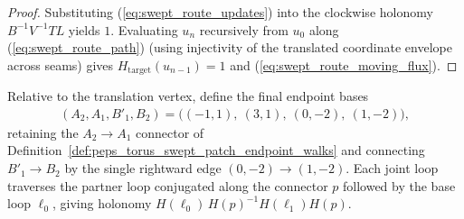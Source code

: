 \begin{proof}\leanok
    Substituting (\ref{eq:swept_route_updates}) into the clockwise holonomy $B^{-1}V^{-1}TL$ yields $1$.
    Evaluating $u_n$ recursively from $u_0$ along (\ref{eq:swept_route_path}) (using injectivity of the translated coordinate envelope across seams) gives $H_{\mathrm{target}}(u_{n-1})=1$ and (\ref{eq:swept_route_moving_flux}).
\end{proof}

\begin{definition}%
    \label{def:peps_torus_swept_route_partner_walks}
    \leanok
    Relative to the translation vertex, define the final endpoint bases
    \begin{align}
        (A_2,A_1,B'_1,B_2) = \bigl((-1,1),\ (3,1),\ (0,-2),\ (1,-2)\bigr), \label{eq:final_endpoint_bases}
    \end{align}
    retaining the $A_2\to A_1$ connector of Definition~\ref{def:peps_torus_swept_patch_endpoint_walks} and connecting $B'_1\to B_2$ by the single rightward edge $(0,-2)\to(1,-2)$.
    Each joint loop traverses the partner loop conjugated along the connector $p$ followed by the base loop $\ell_0$, giving holonomy $H(\ell_0)\,H(p)^{-1}H(\ell_1)H(p)$.
\end{definition}

